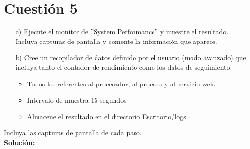 \documentclass[a4paper, 10pt]{article} %
\begin{document}
\section{Cuestión 5}
\begin{itemize}
\item[a)] Ejecute el monitor de ''System Performance'' y muestre el resultado. Incluya capturas de pantalla y comente la información que aparece.
\item[b)] Cree un recopilador de datos definido por el usuario (modo avanzado) que incluya tanto el contador de rendimiento como los datos de seguimiento:
\begin{itemize}
\item Todos los referentes al procesador, al proceso y al servicio web.
\item Intervalo de muestra 15 segundos
\item Almacene el resultado en el directorio Escritorio/logs
\end{itemize}
\end{itemize}
 Incluya las capturas de pantalla de cada paso.\\
 \textbf{Solución:}\\
\end{document}
